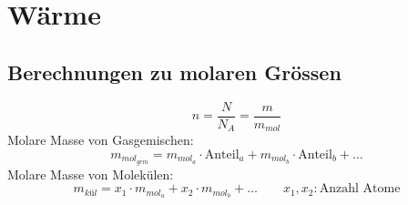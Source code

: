 



\chapter{Wärme}

\newpage

\newpage

\begin{comment}
\section{Begriffe}
\[ \begin{array}{@{}ll} 
n:      & \text{Stoffmenge $[mol]$} \\
N:      & \text{Anzahl Teilchen} \\
m:      & \text{Masse} \\
m_{mol}:& \text{Molare Masse 
          (Siehe Periodensystem auf Seite \pageref{fig:persys})} 
          \left\lbrack\frac{g}{mol}\right\rbrack \\
T:      & \text{Tempteratur in $K$ } 
            (T = T_{^\circ C} + 273.15 ^\circ C) \\
N_A:    & \text{Avogadrozahl }
            (6.022~141~3 \cdot 10^{23} \frac{1}{mol}) \\
k_B:    & \text{Boltzmannkonstante } 
            (1.380~648~8 \cdot 10^{-23} \frac{J}{K} ) \\
R:      & \text{Gaskonstante } 
            (8.314~462~1 \frac{J}{mol \cdot K}) \\
\end{array} \]
\end{comment}

\section{Berechnungen zu molaren Grössen}
\[ \boxed{n = \frac{N}{N_A} = \frac{m}{m_{mol}}} \]
Molare Masse von Gasgemischen: 
\[ \boxed{m_{mol_{gem}} = m_{mol_{a}} \cdot \text{Anteil}_a 
+ m_{mol_{b}} \cdot \text{Anteil}_b + \dots} \]
Molare Masse von Molekülen: 
\[ \boxed{m_{kül} = x_1 \cdot m_{mol_a} + x_2 \cdot m_{mol_b} + \dots } 
\qquad x_1, x_2: \text{Anzahl Atome} \]

